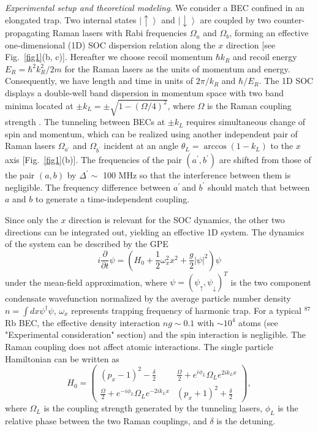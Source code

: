 \documentclass[twocolumn,prl,floatfix,citeautoscript,nofootinbib,superscriptaddress]{revtex4}
\begin{document}
{\color{blue}\emph{Experimental setup and theoretical modeling}}. We
consider a BEC confined in an elongated trap. Two internal states $%
\left\vert \uparrow \right\rangle $ and $\left\vert \downarrow \right\rangle
$ are coupled by two counter-propagating Raman lasers with Rabi frequencies $%
\Omega _{a}$ and $\Omega _{b}$, forming an effective one-dimensional (1D)
SOC dispersion relation along the $x$ direction [see Fig.~\ref{fig1}(b, c)].
Hereafter we choose recoil momentum $\hbar k_{R}$ and recoil energy $%
E_{R}=\hbar ^{2}k_{R}^{2}/2m$ for the Raman lasers as the units of momentum
and energy. Consequently, we have length and time in units of $2\pi /k_{R}$
and $\hbar /E_{R}$. The 1D SOC displays a double-well band dispersion in
momentum space with two band minima located at $\pm k_{L}=\pm \sqrt{1-\left(
\Omega /4\right) ^{2}}$, where $\Omega $ is the Raman coupling strength \cite%
{Li2012}. The tunneling between BECs at $\pm k_{L}$ requires simultaneous
change of spin and momentum, which can be realized using another independent
pair of Raman lasers $\Omega _{a^{\prime }}$ and $\Omega _{b^{\prime }}$
incident at an angle $\theta _{L}=\arccos \left( 1-k_{L}\right) $ to the $x$
axis [Fig.~\ref{fig1}(b)]. The frequencies of the pair $(a^{\prime
},b^{\prime })$ are shifted from those of the pair $(a,b)$ by $\Delta
^{\prime }\sim $ 100 MHz so that the interference between them is
negligible. The frequency difference between $a^{\prime }\ $and $b^{\prime }$
should match that between $a$ and $b$ to generate a time-independent
coupling.

Since only the $x$ direction is relevant for the SOC dynamics, the other two
directions can be integrated out, yielding an effective 1D system. The
dynamics of the system can be described by the GPE%
\begin{equation}
i\frac{\partial }{\partial t}\psi =(H_{0}+\frac{1}{2}\omega _{x}^{2}x^{2}+%
\frac{g}{2}|\psi |^{2})\psi
\end{equation}%
under the mean-field approximation, where $\psi =\left( \psi _{\uparrow
},\psi _{\downarrow }\right) ^{T}$ is the two component condensate
wavefunction normalized by the average particle number density $n=\int
dx\psi ^{\dagger }\psi $, $\omega _{x}$ represents trapping frequency of
harmonic trap. For a typical $^{87}$Rb BEC, the effective density
interaction $ng\sim 0.1$ with $\sim 10^{4}$ atoms (see "Experimental
consideration" section) and the spin interaction is negligible. The Raman
coupling does not affect atomic interactions. The single particle
Hamiltonian can be written as~\cite{Supp,Brion2007}
\begin{equation}
H_{0}=\left(
\begin{array}{cc}
(p_{x}-1)^{2}-\frac{\delta }{2} & \frac{\Omega }{2}+e^{i\phi _{L}}\Omega
_{L}e^{2ik_{L}x} \\
\frac{\Omega }{2}+e^{-i\phi _{L}}\Omega _{L}e^{-2ik_{L}x} & (p_{x}+1)^{2}+%
\frac{\delta }{2}%
\end{array}%
\right) ,  \label{SH}
\end{equation}%
where $\Omega _{L}$ is the coupling strength generated by the tunneling
lasers, $\phi _{L}$ is the relative phase between the two Raman couplings,
and $\delta $ is the detuning.
\end{document}
